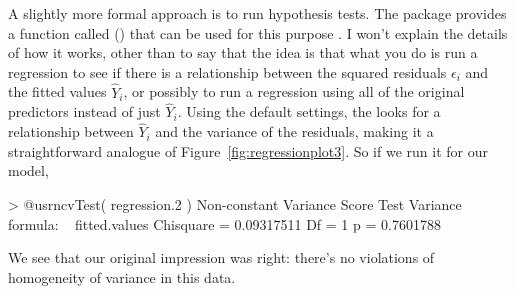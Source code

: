 A slightly more formal approach is to run hypothesis tests. The  package provides a function called  () that can be used for this purpose \cite{Cook1983}. I won't explain the details of how it works, other than to say that the idea is that what you do is run a regression to see if there is a relationship between the squared residuals $\epsilon_i$ and the fitted values $\hat{Y}_i$, or possibly to run a regression using all of the original predictors instead of just $\hat{Y}_i$. Using the default settings, the  looks for a relationship between $\hat{Y}_i$ and the variance of the residuals, making it a straightforward analogue of Figure~\ref{fig:regressionplot3}. So if we run it for our model,
\begin{rblock1}
> @usr{ncvTest( regression.2 )}
Non-constant Variance Score Test 
Variance formula: ~ fitted.values 
Chisquare = 0.09317511    Df = 1     p = 0.7601788 
\end{rblock1}
We see that our original impression was right: there's no violations of homogeneity of variance in this data.

